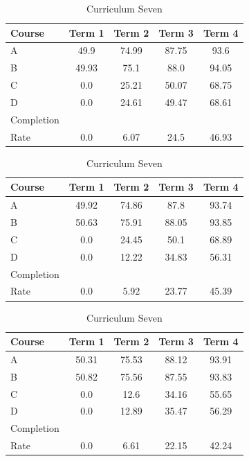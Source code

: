 \documentclass[botnum, fleqn]{unmeethesis}
\begin{document}
\begin{table}[!h]
      \vspace*{1cm}
      \begin{subtable}{0.45\linewidth}
        \centering
          \caption{Curriculum Five}
          \label{tab:simple10}
          \begin{tabular}{l*{4}{c}}
            Course  & Term 1 & Term 2 & Term 3 & Term 4 \\
            \hline
            A & 49.9  & 74.99 & 87.75 & 93.6  \\
            B & 49.93 & 75.1  & 88.0  & 94.05 \\
            C & 0.0   & 25.21 & 50.07 & 68.75 \\
            D & 0.0   & 24.61 & 49.47 & 68.61 \\
            \hline
            Completion \\ Rate & 0.0   & 6.07  & 24.5  & 46.93 \\
          \end{tabular}
      \end{subtable}
      \hfill
      \begin{subtable}{0.45\linewidth}
        \centering
          \caption{Curriculum Six}
          \label{tab:simple11}
          \begin{tabular}{l*{4}{c}}
            Course  & Term 1 & Term 2 & Term 3 & Term 4 \\
            \hline
            A  & 49.92 & 74.86 & 87.8  & 93.74 \\
            B  & 50.63 & 75.91 & 88.05 & 93.85 \\
            C  & 0.0   & 24.45 & 50.1  & 68.89 \\
            D  & 0.0   & 12.22 & 34.83 & 56.31 \\
            \hline
            Completion \\ Rate & 0.0   & 5.92  & 23.77 & 45.39 \\
          \end{tabular}
      \end{subtable} 
      \label{tab:simpleResults}

      \vspace*{1cm}
      \begin{subtable}{0.45\linewidth}
        \centering
          \caption{Curriculum Seven}
          \label{tab:simple12}
          \begin{tabular}{l*{4}{c}}
            Course  & Term 1 & Term 2 & Term 3 & Term 4 \\
            \hline
            A  & 50.31 & 75.53 & 88.12 & 93.91 \\
            B  & 50.82 & 75.56 & 87.55 & 93.83 \\
            C  & 0.0   & 12.6  & 34.16 & 55.65 \\
            D  & 0.0   & 12.89 & 35.47 & 56.29 \\
            \hline
            Completion \\ Rate & 0.0   & 6.61  & 22.15 & 42.24 \\
          \end{tabular}
      \end{subtable} 
      \label{tab:simpleResults}
    \end{table}
\end{document}
